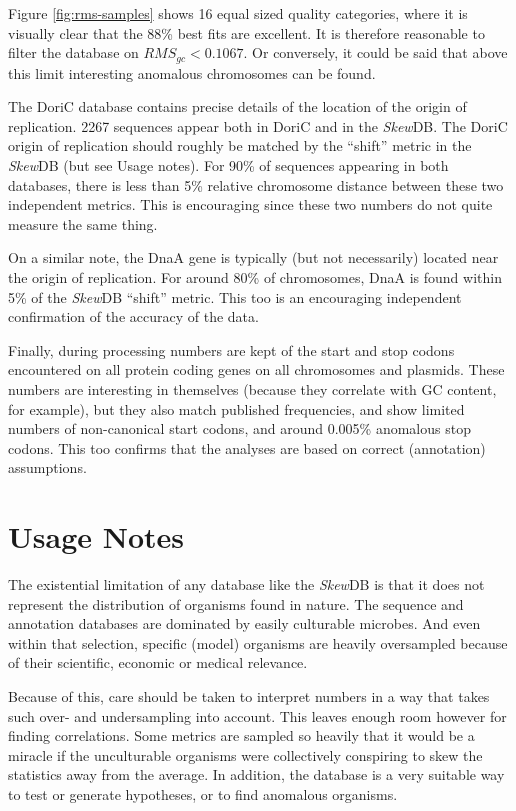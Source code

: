 \documentclass[fleqn,10pt]{wlscirep}
\begin{document}
Figure \ref{fig:rms-samples} shows 16 equal sized quality categories, where it is visually clear that the 88\% best fits are excellent. It is therefore reasonable to filter the database on $RMS_{gc}<0.1067$. Or conversely, it could be said that above this limit interesting anomalous chromosomes can be found. 

The DoriC database \cite{luo_doric_2019} contains precise details of the location of the origin of replication. 2267 sequences appear both in DoriC and in the \emph{Skew}DB. The DoriC origin of replication should roughly be matched by the ``shift'' metric in the \emph{Skew}DB (but see Usage notes). For 90\% of sequences appearing in both databases, there is less than 5\% relative chromosome distance between these two independent metrics. This is encouraging since these two numbers do not quite measure the same thing.

On a similar note, the DnaA gene is typically (but not necessarily) located near the origin of replication. For around 80\% of chromosomes, DnaA is found within 5\% of the \emph{Skew}DB ``shift'' metric. This too is an encouraging independent confirmation of the accuracy of the data.

Finally, during processing numbers are kept of the start and stop codons encountered on all protein coding genes on all chromosomes and plasmids. These numbers are interesting in themselves (because they correlate with GC content, for example), but they also match published frequencies, and show limited numbers of non-canonical start codons, and around 0.005\% anomalous stop codons. This too confirms that the analyses are based on correct (annotation) assumptions.

\section*{Usage Notes}
The existential limitation of any database like the \emph{Skew}DB is that it does not represent the distribution of organisms found in nature. The sequence and annotation databases are dominated by easily culturable microbes. And even within that selection, specific (model) organisms are heavily oversampled because of their scientific, economic or medical relevance.

Because of this, care should be taken to interpret numbers in a way that takes such over- and undersampling into account. This leaves enough room however for finding correlations. Some metrics are sampled so heavily that it would be a miracle if the unculturable organisms were collectively conspiring to skew the statistics away from the average. In addition, the database is a very suitable way to test or generate hypotheses, or to find anomalous organisms.
\end{document}

